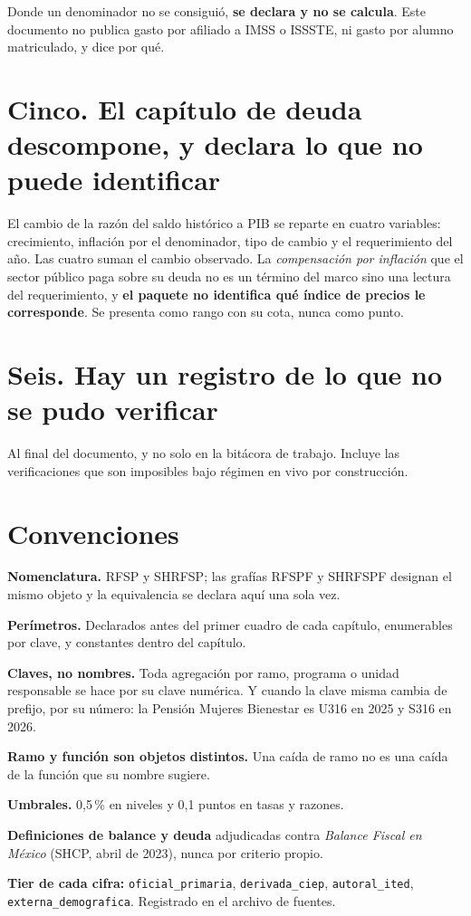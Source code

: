 Donde un denominador no se consiguió, \textbf{se declara y no se calcula}. Este documento no
publica gasto por afiliado a IMSS o ISSSTE, ni gasto por alumno matriculado, y dice por qué.

\section*{Cinco. El capítulo de deuda descompone, y declara lo que no puede identificar}

El cambio de la razón del saldo histórico a PIB se reparte en cuatro variables: crecimiento,
inflación por el denominador, tipo de cambio y el requerimiento del año. Las cuatro suman el
cambio observado. La \emph{compensación por inflación} que el sector público paga sobre su
deuda no es un término del marco sino una lectura del requerimiento, y \textbf{el paquete no
identifica qué índice de precios le corresponde}. Se presenta como rango con su cota, nunca
como punto.

\section*{Seis. Hay un registro de lo que no se pudo verificar}

Al final del documento, y no solo en la bitácora de trabajo. Incluye las verificaciones que
son imposibles bajo régimen en vivo por construcción.

\section*{Convenciones}

\begin{list}{}{\setlength{\leftmargin}{1.2em}\setlength{\itemsep}{1pt}}
\item[] \textbf{Nomenclatura.} RFSP y SHRFSP; las grafías RFSPF y SHRFSPF designan el mismo
objeto y la equivalencia se declara aquí una sola vez.
\item[] \textbf{Perímetros.} Declarados antes del primer cuadro de cada capítulo, enumerables
por clave, y constantes dentro del capítulo.
\item[] \textbf{Claves, no nombres.} Toda agregación por ramo, programa o unidad responsable
se hace por su clave numérica. Y cuando la clave misma cambia de prefijo, por su número: la
Pensión Mujeres Bienestar es U316 en 2025 y S316 en 2026.
\item[] \textbf{Ramo y función son objetos distintos.} Una caída de ramo no es una caída de la
función que su nombre sugiere.
\item[] \textbf{Umbrales.} 0,5\,\% en niveles y 0,1 puntos en tasas y razones.
\item[] \textbf{Definiciones de balance y deuda} adjudicadas contra \emph{Balance Fiscal en
México} (SHCP, abril de 2023), nunca por criterio propio.
\item[] \textbf{Tier de cada cifra:} \texttt{oficial\_primaria}, \texttt{derivada\_ciep},
\texttt{autoral\_ited}, \texttt{externa\_demografica}. Registrado en el archivo de fuentes.
\end{list}

